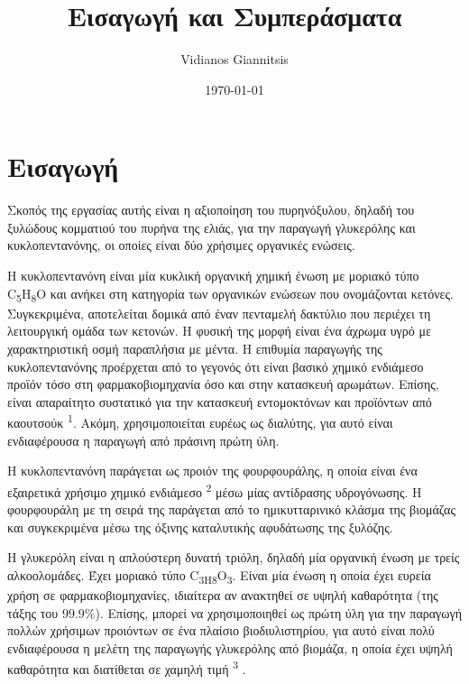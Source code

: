 \documentclass[11pt]{article}
\author{Vidianos Giannitsis}
\date{\today}
\title{Εισαγωγή και Συμπεράσματα}
\begin{document}
\maketitle
\tableofcontents

\renewcommand{\abstractname}{Περίληψη}
\renewcommand{\tablename}{Πίνακας}
\renewcommand{\figurename}{Σχήμα}
\renewcommand\listingscaption{Κώδικας}

\section{Εισαγωγή}
\label{sec:org96de981}
Σκοπός της εργασίας αυτής είναι η αξιοποίηση του πυρηνόξυλου, δηλαδή του ξυλώδους κομματιού του πυρήνα της ελιάς, για την παραγωγή γλυκερόλης και κυκλοπεντανόνης, οι οποίες είναι δύο χρήσιμες οργανικές ενώσεις.

H κυκλοπεντανόνη είναι μία κυκλική οργανική χημική ένωση με μοριακό
τύπο C\textsubscript{5}H\textsubscript{8}O και ανήκει στη κατηγορία των οργανικών ενώσεων που
ονομάζονται κετόνες. Συγκεκριμένα, αποτελείται δομικά
από έναν πενταμελή δακτύλιο που περιέχει τη λειτουργική ομάδα των
κετονών. Η φυσική της μορφή είναι ένα άχρωμα υγρό με χαρακτηριστική οσμή
παραπλήσια με μέντα. Η επιθυμία παραγωγής της κυκλοπεντανόνης προέρχεται
από το γεγονός ότι είναι βασικό χημικό ενδιάμεσο προϊόν τόσο στη
φαρμακοβιομηχανία όσο και στην κατασκευή αρωμάτων. Επίσης, είναι
απαραίτητο συστατικό για την κατασκευή εντομοκτόνων και προϊόντων από
καουτσούκ \textsuperscript{1}. Ακόμη, χρησιμοποιείται ευρέως ως διαλύτης, για αυτό είναι ενδιαφέρουσα η παραγωγή από πράσινη πρώτη ύλη.

Η κυκλοπεντανόνη παράγεται ως προιόν της φουρφουράλης, η οποία είναι ένα εξαιρετικά χρήσιμο χημικό ενδιάμεσο \textsuperscript{2} μέσω μίας αντίδρασης υδρογόνωσης. Η φουρφουράλη με τη σειρά της παράγεται από το ημικυτταρινικό κλάσμα της βιομάζας και συγκεκριμένα μέσω της όξινης καταλυτικής αφυδάτωσης της ξυλόζης.

Η γλυκερόλη είναι η απλούστερη δυνατή τριόλη, δηλαδή μία οργανική ένωση με τρείς αλκοολομάδες. Έχει μοριακό τύπο C\textsubscript{3H}\textsubscript{8}O\textsubscript{3}. Είναι μία ένωση η οποία έχει ευρεία χρήση σε φαρμακοβιομηχανίες, ιδιαίτερα αν ανακτηθεί σε υψηλή καθαρότητα (της τάξης του \(99.9 \%\)). Επίσης, μπορεί να χρησιμοποιηθεί ως πρώτη ύλη για την παραγωγή πολλών χρήσιμων προιόντων σε ένα πλαίσιο βιοδιυλιστηρίου, για αυτό είναι πολύ ενδιαφέρουσα η μελέτη της παραγωγής γλυκερόλης από βιομάζα, η οποία έχει υψηλή καθαρότητα και διατίθεται σε χαμηλή τιμή \textsuperscript{3} .
\end{document}
